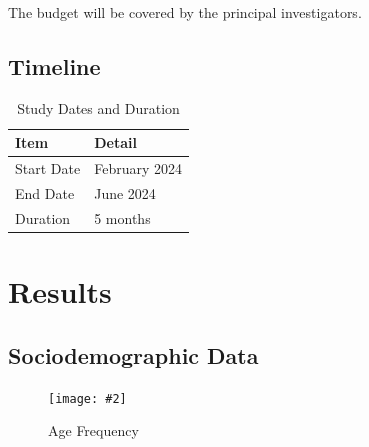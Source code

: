 \documentclass[jou]{apa7}
\newcommand{\includegraphicsmax}[2][]{%
	\texttt{[image: \#2]}%
}
\begin{document}
The budget will be covered by the principal investigators.

\subsection{Timeline}\label{cronograma}

\begin{table}[!ht!]
	\centering
	\begin{tabular}{@{}ll@{}}
		\toprule
		\textbf{Item}                & \textbf{Detail}     \\ \midrule
		Start Date              & February 2024         \\
		End Date        & June 2024           \\
		Duration                     & 5 months              \\ \bottomrule
	\end{tabular}
	\caption{Study Dates and Duration}
	\label{tab:fechas-duracion}
\end{table}

\section{Results}\label{resultados}

\subsection{Sociodemographic Data}

\begin{figure}[!ht]
	\centering
	\includegraphicsmax{freq.age.pdf}
	\caption{Age Frequency}
	\label{fig:Figure1}
\end{figure}
\end{document}
